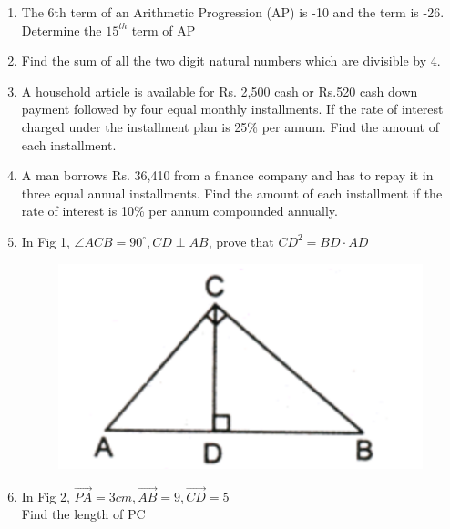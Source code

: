 \documentclass[journal,12pt,twocolumn]{IEEEtran}
\begin{document}
\begin{enumerate}[label=1.\arabic*]
\item The 6th term of an Arithmetic Progression (AP) is -10 and the term is -26. Determine the $15^{th}$ term of AP\\
\item Find the sum of all the two digit natural numbers which are divisible by 4.\\
\item A household article is available for Rs. 2,500 cash or Rs.520 cash down payment followed by four equal monthly installments.
If the rate of interest charged under the installment plan is 25\% per annum. Find the amount of each installment.\\
\item A man borrows Rs. 36,410 from a finance company and has to repay it in three equal annual installments. Find the amount of each
installment if the rate of interest is 10\% per annum compounded annually.\\
\item In Fig 1, $\angle{ACB} = 90^\circ , CD \perp AB $, prove that $CD^2 = BD \cdot AD $\\

\begin{figure}[width=0.5\columnwidth,center]
\centering
\includegraphics[scale = 0.75]{fig 1.1}\\
\caption{}
\label{fig1}
\end{figure}

\vspace{2mm}
\item In Fig 2, $\vec{PA} = 3cm, \vec{AB} = 9, \vec{CD} = 5$\\
Find the length of PC\\


\end{enumerate}
\end{document}
